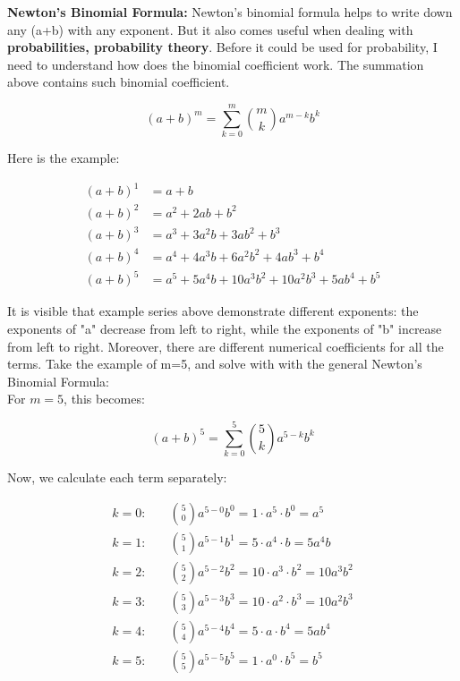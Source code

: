 \documentclass{article}
\begin{document}
\vspace{1cm}

\textbf{Newton's Binomial Formula:} Newton's binomial formula helps to write down any (a+b) with any exponent. But it also comes useful when dealing with \textbf{probabilities, probability theory}. Before it could be used for probability, I need to understand how does the binomial coefficient work. The summation above contains such binomial coefficient.    

\begin{equation}
(a+b)^m = \sum_{k=0}^{m} \binom{m}{k} a^{m-k} b^{k}
\end{equation}

Here is the example: 

\begin{align*}
(a + b)^1 &= a + b \\
(a + b)^2 &= a^2 + 2ab + b^2 \\
(a + b)^3 &= a^3 + 3a^2b + 3ab^2 + b^3 \\
(a + b)^4 &= a^4 + 4a^3b + 6a^2b^2 + 4ab^3 + b^4 \\
(a + b)^5 &= a^5 + 5a^4b + 10a^3b^2 + 10a^2b^3 + 5ab^4 + b^5
\end{align*}

It is visible that example series above demonstrate different exponents: the exponents of "a" decrease from left to right, while the exponents of "b" increase from left to right. Moreover, there are different numerical coefficients for all the terms. Take the example of m=5, and solve with with the general Newton's Binomial Formula: \\

For \(m = 5\), this becomes:

\begin{equation*}
(a + b)^5 = \sum_{k=0}^{5} \binom{5}{k} a^{5-k} b^{k}
\end{equation*}

Now, we calculate each term separately:

\begin{align*}
k = 0: & \quad \binom{5}{0} a^{5-0} b^{0} = 1 \cdot a^5 \cdot b^0 = a^5 \\[8pt]
k = 1: & \quad \binom{5}{1} a^{5-1} b^{1} = 5 \cdot a^4 \cdot b = 5a^4 b \\[8pt]
k = 2: & \quad \binom{5}{2} a^{5-2} b^{2} = 10 \cdot a^3 \cdot b^2 = 10a^3 b^2 \\[8pt]
k = 3: & \quad \binom{5}{3} a^{5-3} b^{3} = 10 \cdot a^2 \cdot b^3 = 10a^2 b^3 \\[8pt]
k = 4: & \quad \binom{5}{4} a^{5-4} b^{4} = 5 \cdot a \cdot b^4 = 5a b^4 \\[8pt]
k = 5: & \quad \binom{5}{5} a^{5-5} b^{5} = 1 \cdot a^0 \cdot b^5 = b^5
\end{align*}
\end{document}
